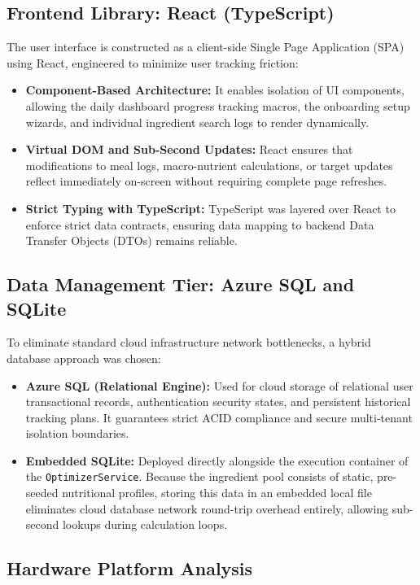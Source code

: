 \subsection{Frontend Library: React (TypeScript)}
The user interface is constructed as a client-side Single Page Application (SPA) 
using React, engineered to minimize user tracking friction:
\begin{itemize}
    \item \textbf{Component-Based Architecture:} It enables isolation of UI components, 
    allowing the daily dashboard progress tracking macros, the onboarding setup wizards, 
    and individual ingredient search logs to render dynamically.
    \item \textbf{Virtual DOM and Sub-Second Updates:} React ensures that modifications 
    to meal logs, macro-nutrient calculations, or target updates reflect immediately 
    on-screen without requiring complete page refreshes.
    \item \textbf{Strict Typing with TypeScript:} TypeScript was layered over React to 
    enforce strict data contracts, ensuring data mapping to backend Data Transfer 
    Objects (DTOs) remains reliable.
\end{itemize}

\subsection{Data Management Tier: Azure SQL and SQLite}
To eliminate standard cloud infrastructure network bottlenecks, a hybrid database 
approach was chosen:
\begin{itemize}
    \item \textbf{Azure SQL (Relational Engine):} Used for cloud storage of relational 
    user transactional records, authentication security states, and persistent historical 
    tracking plans. It guarantees strict ACID compliance and secure multi-tenant isolation 
    boundaries.
    \item \textbf{Embedded SQLite:} Deployed directly alongside the execution container 
    of the \texttt{OptimizerService}. Because the ingredient pool consists of static, 
    pre-seeded nutritional profiles, storing this data in an embedded local file 
    eliminates cloud database network round-trip overhead entirely, allowing sub-second 
    lookups during calculation loops.
\end{itemize}

\subsection{Hardware Platform Analysis}


